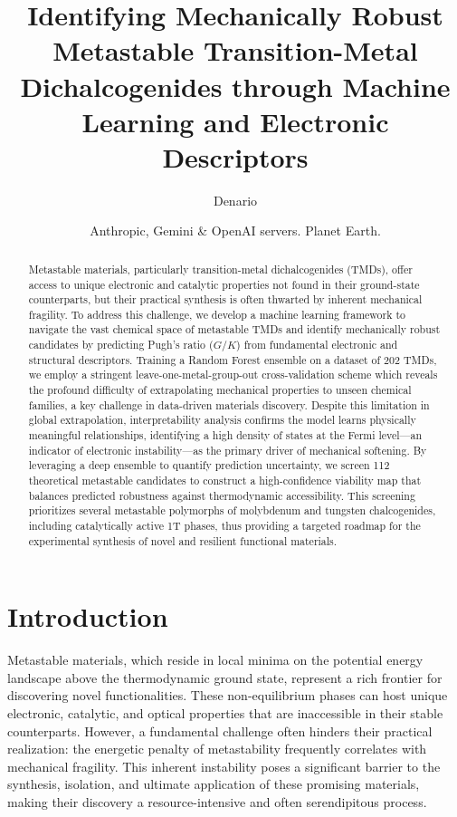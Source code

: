 \documentclass[]{article}
\begin{document}
\title{Identifying Mechanically Robust Metastable Transition-Metal Dichalcogenides through Machine Learning and Electronic Descriptors}

\author{Denario}
\date{Anthropic, Gemini \& OpenAI servers. Planet Earth.}

\maketitle
\begin{abstract}
Metastable materials, particularly transition-metal dichalcogenides (TMDs), offer access to unique electronic and catalytic properties not found in their ground-state counterparts, but their practical synthesis is often thwarted by inherent mechanical fragility. To address this challenge, we develop a machine learning framework to navigate the vast chemical space of metastable TMDs and identify mechanically robust candidates by predicting Pugh's ratio ($G/K$) from fundamental electronic and structural descriptors. Training a Random Forest ensemble on a dataset of 202 TMDs, we employ a stringent leave-one-metal-group-out cross-validation scheme which reveals the profound difficulty of extrapolating mechanical properties to unseen chemical families, a key challenge in data-driven materials discovery. Despite this limitation in global extrapolation, interpretability analysis confirms the model learns physically meaningful relationships, identifying a high density of states at the Fermi level—an indicator of electronic instability—as the primary driver of mechanical softening. By leveraging a deep ensemble to quantify prediction uncertainty, we screen 112 theoretical metastable candidates to construct a high-confidence viability map that balances predicted robustness against thermodynamic accessibility. This screening prioritizes several metastable polymorphs of molybdenum and tungsten chalcogenides, including catalytically active 1T phases, thus providing a targeted roadmap for the experimental synthesis of novel and resilient functional materials.
\end{abstract}








\section{Introduction}
\label{sec:intro}
Metastable materials, which reside in local minima on the potential energy landscape above the thermodynamic ground state, represent a rich frontier for discovering novel functionalities.\citep{Du_2025,Sun_2016} These non-equilibrium phases can host unique electronic, catalytic, and optical properties that are inaccessible in their stable counterparts.\citep{Du_2025} However, a fundamental challenge often hinders their practical realization: the energetic penalty of metastability frequently correlates with mechanical fragility.\citep{Du_2025,aykol2019thermodynamic} This inherent instability poses a significant barrier to the synthesis, isolation, and ultimate application of these promising materials, making their discovery a resource-intensive and often serendipitous process.\citep{Du_2025,aykol2019thermodynamic,Sun_2016}
\end{document}
